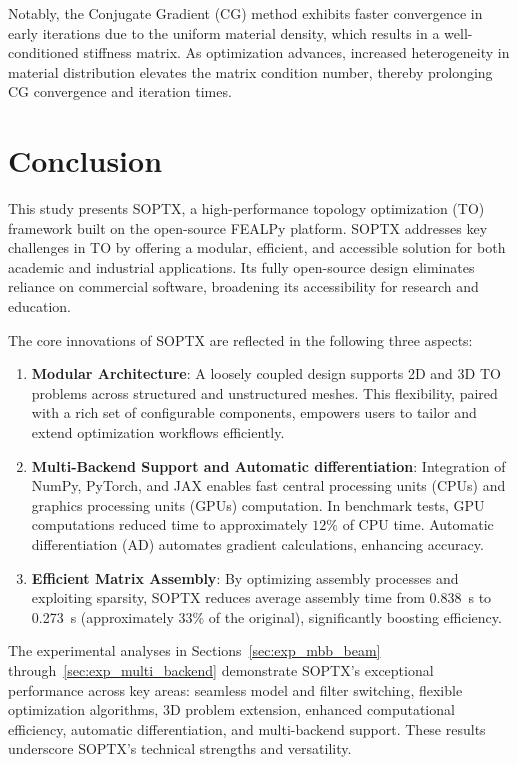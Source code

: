 \documentclass[mathpazo]{cicp}
\begin{document}
Notably, the Conjugate Gradient (CG) method exhibits faster convergence in early iterations due to the uniform material density, which results in a well-conditioned stiffness matrix. As optimization advances, increased heterogeneity in material distribution elevates the matrix condition number, thereby prolonging CG convergence and iteration times.

\section{Conclusion}
This study presents SOPTX, a high-performance topology optimization (TO) framework built on the open-source FEALPy platform. SOPTX addresses key challenges in TO by offering a modular, efficient, and accessible solution for both academic and industrial applications. Its fully open-source design eliminates reliance on commercial software, broadening its accessibility for research and education.

The core innovations of SOPTX are reflected in the following three aspects:
\vspace{-0.5ex} %
\begin{enumerate} 
	\item \textbf{Modular Architecture}: A loosely coupled design supports 2D and 3D TO problems across structured and unstructured meshes. This flexibility, paired with a rich set of configurable components, empowers users to tailor and extend optimization workflows efficiently.
	\item \textbf{Multi-Backend Support and Automatic differentiation}: Integration of NumPy, PyTorch, and JAX enables fast central processing units (CPUs) and graphics processing units (GPUs) computation. In benchmark tests, GPU computations reduced time to approximately $12\%$ of CPU time. Automatic differentiation (AD) automates gradient calculations, enhancing accuracy.
	\item \textbf{Efficient Matrix Assembly}: By optimizing assembly processes and exploiting sparsity, SOPTX reduces average assembly time from \SI{0.838}{s} to \SI{0.273}{s} (approximately $33\%$ of the original), significantly boosting efficiency.
\end{enumerate}
\vspace{-0.5ex} %

The experimental analyses in Sections~\ref{sec:exp_mbb_beam} through~\ref{sec:exp_multi_backend} demonstrate SOPTX's exceptional performance across key areas: seamless model and filter switching, flexible optimization algorithms, 3D problem extension, enhanced computational efficiency, automatic differentiation, and multi-backend support. These results underscore SOPTX's technical strengths and versatility.
\end{document}
